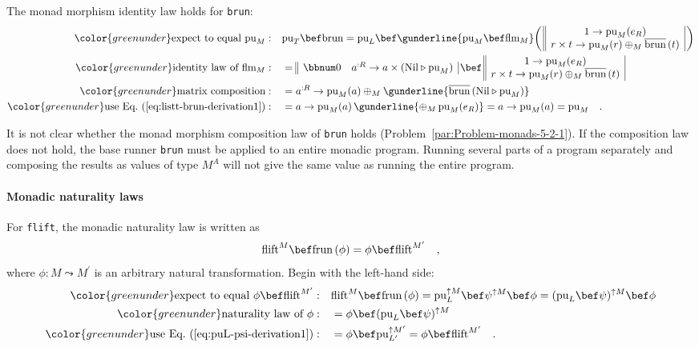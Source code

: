 The monad morphism identity law holds for \lstinline!brun!:
\begin{align*}
{\color{greenunder}\text{expect to equal }\text{pu}_{M}:}\quad & \text{pu}_{T}\bef\text{brun}=\text{pu}_{L}\bef\gunderline{\text{pu}_{M}\bef\text{flm}_{M}}\bigg(\,\begin{array}{||c|}
1\rightarrow\text{pu}_{M}(e_{R})\\
r\times t\rightarrow\text{pu}_{M}(r)\oplus_{M}\overline{\text{brun}}\,(t)
\end{array}\,\bigg)\\
{\color{greenunder}\text{identity law of }\text{flm}_{M}:}\quad & =\begin{array}{||cc|}
\bbnum 0 & a^{:R}\rightarrow a\times(\text{Nil}\triangleright\text{pu}_{M})\end{array}\,\bef\,\begin{array}{||c|}
1\rightarrow\text{pu}_{M}(e_{R})\\
r\times t\rightarrow\text{pu}_{M}(r)\oplus_{M}\overline{\text{brun}}\,(t)
\end{array}\\
{\color{greenunder}\text{matrix composition}:}\quad & =a^{:R}\rightarrow\text{pu}_{M}(a)\oplus_{M}\gunderline{\overline{\text{brun}}\,(\text{Nil}\triangleright\text{pu}_{M})}\\
{\color{greenunder}\text{use Eq.~(\ref{eq:listt-brun-derivation1})}:}\quad & =a\rightarrow\text{pu}_{M}(a)\,\gunderline{\oplus_{M}\,\text{pu}_{M}(e_{R})}=a\rightarrow\text{pu}_{M}(a)=\text{pu}_{M}\quad.
\end{align*}

It is not clear whether the monad morphism composition law of \lstinline!brun!
holds (Problem~\ref{par:Problem-monads-5-2-1}). If the composition
law does not hold, the base runner \lstinline!brun! must be applied
to an entire monadic program. Running several parts of a program separately
and composing the results as values of type $M^{A}$ will not give
the same value as running the entire program.

\paragraph{Monadic naturality laws}

For \lstinline!flift!, the monadic naturality law is written as
\[
\text{flift}^{M}\bef\text{frun}\,(\phi)=\phi\bef\text{flift}^{M^{\prime}}\quad,
\]
where $\phi:M\leadsto M^{\prime}$ is an arbitrary natural transformation.
Begin with the left-hand side:
\begin{align*}
{\color{greenunder}\text{expect to equal }\phi\bef\text{flift}^{M^{\prime}}:}\quad & \text{flift}^{M}\bef\text{frun}\,(\phi)=\text{pu}_{L}^{\uparrow M}\bef\psi^{\uparrow M}\bef\phi=(\text{pu}_{L}\bef\psi)^{\uparrow M}\bef\phi\\
{\color{greenunder}\text{naturality law of }\phi:}\quad & =\phi\bef(\text{pu}_{L}\bef\psi)^{\uparrow M}\\
{\color{greenunder}\text{use Eq.~(\ref{eq:puL-psi-derivation1})}:}\quad & =\phi\bef\text{pu}_{L^{\prime}}^{\uparrow M^{\prime}}=\phi\bef\text{flift}^{M^{\prime}}\quad.
\end{align*}

